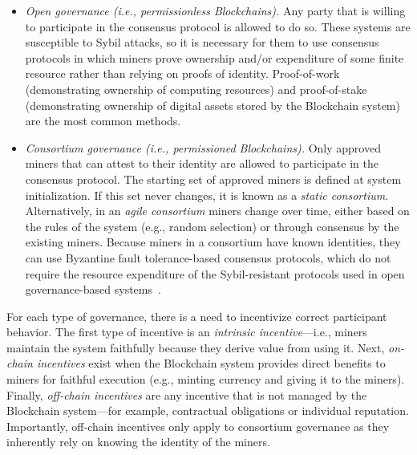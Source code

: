 \begin{itemize}
	\item \emph{Open governance (i.e., permissionless Blockchains).}
	Any party that is willing to participate in the consensus protocol is allowed to do so.
	These systems are susceptible to Sybil attacks, so it is necessary for them to use consensus protocols in which miners prove ownership and/or expenditure of some finite resource rather than relying on proofs of identity.
	Proof-of-work~\cite{DN93,back1997partial,NakamotoS8} (demonstrating ownership of computing resources) and proof-of-stake~\cite{Bano17,garay2018consensus} (demonstrating ownership of digital assets stored by the Blockchain system) are the most common methods.
	
	\item \emph{Consortium governance (i.e., permissioned Blockchains).}
	Only approved miners that can attest to their identity are allowed to participate in the consensus protocol.
	The starting set of approved miners is defined at system initialization.
	If this set never changes, it is known as a \emph{static consortium}.
	Alternatively, in an \emph{agile consortium} miners change over time, either based on the rules of the system (e.g., random selection) or through consensus by the existing miners.
	Because miners in a consortium have known identities, they can use Byzantine fault tolerance-based consensus protocols, which do not require the resource expenditure of the Sybil-resistant protocols used in open governance-based systems~\cite{Bano17,garay2018consensus}.		
\end{itemize}

For each type of governance, there is a need to incentivize correct participant behavior.
The first type of incentive is an \emph{intrinsic incentive}---i.e., miners maintain the system faithfully because they derive value from using it.
Next, \emph{on-chain incentives} exist when the Blockchain system provides direct benefits to miners for faithful execution (e.g., minting currency and giving it to the miners).
Finally, \emph{off-chain incentives} are any incentive that is not managed by the Blockchain system---for example, contractual obligations or individual reputation.
Importantly, off-chain incentives only apply to consortium governance as they inherently rely on knowing the identity of the miners.


